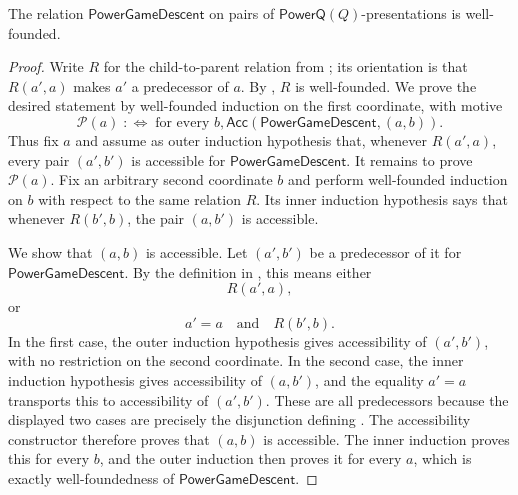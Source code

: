 \begin{lemma}
The relation $\mathsf{PowerGameDescent}$ on pairs of
$\mathsf{PowerQ}(Q)$-presentations is well-founded.
\end{lemma}
\begin{proof}
Write $R$ for the child-to-parent relation from ; its
orientation is that $R(a',a)$ makes $a'$ a predecessor of $a$.  By
, $R$ is well-founded.  We prove the desired
statement by well-founded induction on the first coordinate, with motive
\[
  \mathcal P(a)\;:\!\iff\;\text{for every }b,
  \mathsf{Acc}(\mathsf{PowerGameDescent},(a,b)).
\]
Thus fix $a$ and assume as outer induction hypothesis that, whenever
$R(a',a)$, every pair $(a',b')$ is accessible for
$\mathsf{PowerGameDescent}$.  It remains to prove $\mathcal P(a)$.  Fix an
arbitrary second coordinate $b$ and perform well-founded induction on $b$
with respect to the same relation $R$.  Its inner induction hypothesis says
that whenever $R(b',b)$, the pair $(a,b')$ is accessible.

We show that $(a,b)$ is accessible.  Let $(a',b')$ be a predecessor of it
for $\mathsf{PowerGameDescent}$.  By the definition in
, this means either
\[
  R(a',a),
\]
or
\[
  a'=a\quad\text{and}\quad R(b',b).
\]
In the first case, the outer induction hypothesis gives accessibility of
$(a',b')$, with no restriction on the second coordinate.  In the second
case, the inner induction hypothesis gives accessibility of $(a,b')$, and
the equality $a'=a$ transports this to accessibility of $(a',b')$.
These are all predecessors because the displayed two cases are precisely
the disjunction defining .  The accessibility
constructor therefore proves that $(a,b)$ is accessible.  The inner
induction proves this for every $b$, and the outer induction then proves it
for every $a$, which is exactly well-foundedness of
$\mathsf{PowerGameDescent}$.
\end{proof}
